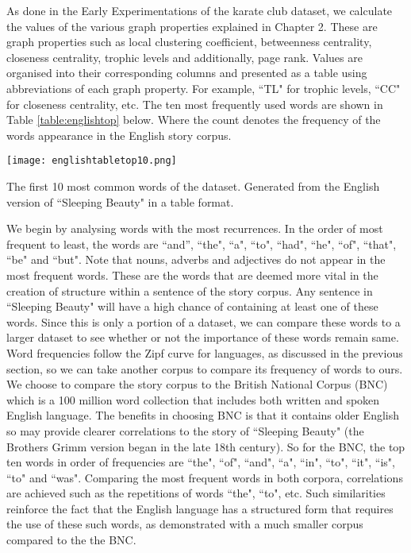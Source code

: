 As done in the Early Experimentations of the karate club dataset, we calculate the values of the various graph properties explained in Chapter 2. These are graph properties such as local clustering coefficient, betweenness centrality, closeness centrality, trophic levels and additionally, page rank. Values are organised into their corresponding columns and presented as a table using abbreviations of each graph property. For example, ``TL" for trophic levels, ``CC" for closeness centrality, etc. The ten most frequently used words are shown in Table \ref{table:englishtop} below. Where the count denotes the frequency of the words appearance in the English story corpus. 

\begin{table}[!htb]
\centering
\texttt{[image: englishtabletop10.png]}
\caption{The first 10 most common words of the dataset. Generated from the English version of ``Sleeping Beauty" in a table format.}
\label{table:englishtop}
\end{table}

We begin by analysing words with the most recurrences. In the order of most frequent to least, the words are ``and'', ``the", ``a", ``to", ``had", ``he", ``of", ``that", ``be" and ``but". Note that nouns, adverbs and adjectives do not appear in the most frequent words. These are the words that are deemed more vital in the creation of structure within a sentence of the story corpus. Any sentence in ``Sleeping Beauty" will have a high chance of containing at least one of these words. Since this is only a portion of a dataset, we can compare these words to a larger dataset to see whether or not the importance of these words remain same. Word frequencies follow the Zipf curve for languages, as discussed in the previous section, so we can take another corpus to compare its frequency of words to ours. We choose to compare the story corpus to the British National Corpus (BNC) \cite{bnc2007british} which is a 100 million word collection that includes both written and spoken English language. The benefits in choosing BNC is that it contains older English so may provide clearer correlations to the story of ``Sleeping Beauty" (the Brothers Grimm version began in the late 18th century). So for the BNC, the top ten words \cite{leech2014word} in order of frequencies are ``the", ``of", ``and", ``a", ``in", ``to", ``it", ``is", ``to" and ``was". Comparing the most frequent words in both corpora, correlations are achieved such as the repetitions of words ``the", ``to", etc. Such similarities reinforce the fact that the English language has a structured form that requires the use of these such words, as demonstrated with a much smaller corpus compared to the the BNC.

